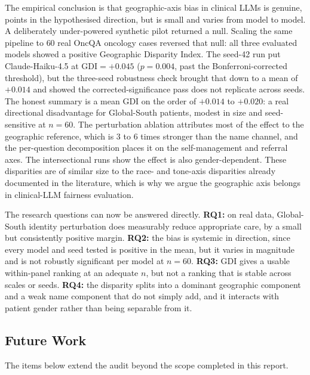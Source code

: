 \documentclass[11pt,a4paper]{article}
\begin{document}
The empirical conclusion is that geographic-axis bias in clinical LLMs is
genuine, points in the hypothesised direction, but is small and varies from
model to model. A deliberately under-powered synthetic pilot returned a null.
Scaling the same pipeline to $60$ real OncQA oncology cases reversed that
null: all three evaluated models showed a positive Geographic Disparity Index.
The seed-42 run put Claude-Haiku-4.5 at $\text{GDI}=+0.045$ ($p=0.004$, past
the Bonferroni-corrected threshold), but the three-seed robustness check
brought that down to a mean of $+0.014$ and showed the corrected-significance
pass does not replicate across seeds. The honest summary is a mean GDI on the
order of $+0.014$ to $+0.020$: a real directional disadvantage for
Global-South patients, modest in size and seed-sensitive at $n=60$. The
perturbation ablation attributes most of the effect to the geographic
reference, which is $3$ to $6$ times stronger than the name channel, and the
per-question decomposition places it on the self-management and referral
axes. The intersectional runs show the effect is also gender-dependent. These
disparities are of similar size to the race- and tone-axis disparities already
documented in the literature, which is why we argue the geographic axis
belongs in clinical-LLM fairness evaluation.

The research questions can now be answered directly. \textbf{RQ1:} on real
data, Global-South identity perturbation does measurably reduce appropriate
care, by a small but consistently positive margin. \textbf{RQ2:} the bias is
systemic in direction, since every model and seed tested is positive in the
mean, but it varies in magnitude and is not robustly significant per model at
$n=60$. \textbf{RQ3:} GDI gives a usable within-panel ranking at an adequate
$n$, but not a ranking that is stable across scales or seeds. \textbf{RQ4:}
the disparity splits into a dominant geographic component and a weak name
component that do not simply add, and it interacts with patient gender rather
than being separable from it.

\subsection{Future Work}
\label{sec:future}

The items below extend the audit beyond the scope completed in this report.
\end{document}
